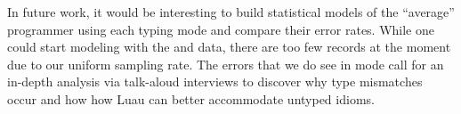 \documentclass[english,submission,cleveref]{programming}
\begin{document}
In future work, it would be interesting to build statistical models of
the ``average'' programmer using each typing mode and compare their error
rates.
While one could start modeling with the \mnocheck{} and \mnonstrict{}
data, there are too few \mstrict{} records at the moment due to our uniform
sampling rate.
The errors that we do see in \mstrict{} mode call for an in-depth analysis via
talk-aloud interviews to discover why type mismatches occur and how how Luau
can better accommodate untyped idioms.






%
%
%
%
%
%


\end{document}
